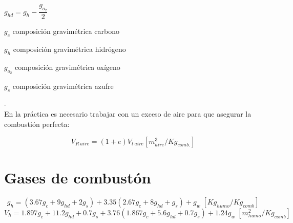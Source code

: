 \documentclass[11pt,a4paper]{article}
\begin{document}
\begin{cajita}
\begin{flushleft}
		$g_{hd} = g_{h} - \dfrac{g_{o_{2}}}{2}$
		
		$g_{c}$ composición gravimétrica carbono
		
		$g_{h}$ composición gravimétrica hidrógeno
		
		$g_{o_{2}}$ composición gravimétrica oxígeno
		
		$g_{s}$ composición gravimétrica azufre
		
		-
		\\
	
		En la práctica es necesario trabajar con un exceso de aire para que asegurar la combustión perfecta:
		\end{flushleft}
		\begin{equation}
			V_{R \ aire} = (1+e) V_{t \ aire} [m^{3}_{aire}/Kg_{comb.}]
		\end{equation}
		
		\section*{Gases de combustón}
		\begin{equation}
			g_{h} = (3.67 g_{c} + 9 g_{hd} +2 g_{s}) + 3.35 (2.67 g_{c} + 8 g_{hd} + g_{s}) + g_{w} \; [Kg_{humo}/Kg_{comb}]
		\end{equation}
		\begin{equation}
			V_{h} = 1.897 g_{c} + 11.2 g_{hd} +0.7 g_{s} + 3.76 (1.867 g_{c} + 5.6 g_{hd} +0.7 g_{s}) + 1.24 g_{w} \; [m^{2}_{humo}/Kg_{comb}]
		\end{equation}
	\end{cajita}
	
\end{document}
